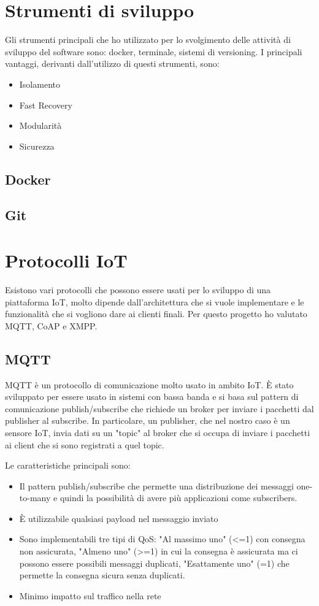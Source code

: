 \newpage
\section{Strumenti di sviluppo}
Gli strumenti principali che ho utilizzato per lo svolgimento delle attività di sviluppo del software sono: docker, terminale, sistemi di versioning.
I principali vantaggi, derivanti dall’utilizzo di questi strumenti, sono:
\begin{itemize}
    \item Isolamento
    \item Fast Recovery
    \item Modularità
    \item Sicurezza
\end{itemize}
\subsection{Docker}
\subsection{Git}
\newpage
\section{Protocolli IoT}
Esistono vari protocolli che possono essere usati per lo sviluppo di una piattaforma IoT, molto dipende dall'architettura che si vuole implementare e le funzionalità che si vogliono dare ai clienti finali.
Per questo progetto ho valutato MQTT, CoAP e XMPP.

\subsection{MQTT}
MQTT è un protocollo di comunicazione molto usato in ambito IoT. 
È stato sviluppato per essere usato in sistemi con bassa banda e si basa sul pattern di comunicazione publish/subscribe che richiede un broker per inviare i pacchetti dal publisher al subscribe. In particolare, un publisher, che nel nostro caso è un sensore IoT, invia dati su un "topic" al broker che si occupa di inviare i pacchetti ai client che si sono registrati a quel topic.

Le caratteristiche principali sono:
\begin{itemize}
  \item Il pattern publish/subscribe che permette una distribuzione dei messaggi one-to-many e quindi la possibilità di avere più applicazioni come subscribers.
  \item È utilizzabile qualsiasi payload nel messaggio inviato
  \item Sono implementabili tre tipi di QoS: "Al massimo uno" (<=1) con consegna non assicurata, "Almeno uno" (>=1) in cui la consegna è assicurata ma ci possono essere possibili messaggi duplicati, "Esattamente uno" (=1) che permette la consegna sicura senza duplicati.
  \item Minimo impatto sul traffico nella rete
\end{itemize}

